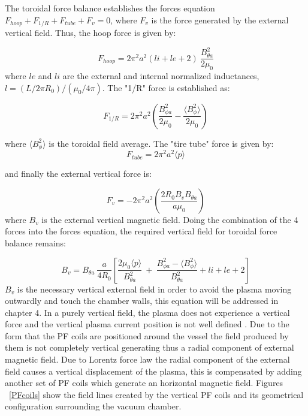 The toroidal force balance establishes the forces equation $F_{hoop}+ F_{1/R} + F_{tube}+ F_{v} =0$, where $F_v$ is the force generated by the external vertical field. Thus, the hoop force is given by:

\begin{equation}
F_{hoop}=2\pi^2a^2(li+le+2)~\frac{B_{\theta a}^2}{2\mu_0}
\end{equation}
 where $le$ and $li$ are the external and internal normalized inductances, $l= (L/2\pi R_0)/(\mu_0/4\pi)$. The "1/R" force is established as:
 
 \begin{equation}
 F_{1/R}=2\pi^2a^2 \left(\frac{ B_{\phi a}^2}{2\mu_0 }-\frac{\langle B_{\phi}^2 \rangle}{ 2\mu_0}\right)
 \end{equation}

where $\langle B_{\phi}^2 \rangle$ is the toroidal field average. The "tire tube" force is given by:
\begin{equation}
F_{tube}=2\pi^2a^2\langle p \rangle
\end{equation}

and finally the external vertical force is:

\begin{equation}
F_v=-2\pi^2a^2\left(\frac{2R_0 B_v B_{\theta a}}{a\mu_0}\right)
\end{equation}
 where $B_v$ is the external vertical magnetic field. Doing the combination of the 4 forces into the forces equation, the required vertical field for toroidal force balance remains:
 
 \begin{equation}
 B_v=B_{\theta a} ~\frac{a}{4R_0}\left[ \frac{2\mu_0 \langle p \rangle }{ B_{\theta a}^2} ~+~\frac{ B_{\phi a}^2 - \langle B_{\phi}^2 \rangle }{B_{\theta a}^2 } +li+le+2 \right]
 \label{force_balance}
 \end{equation}
  $B_v$ is the necessary vertical external field in order to avoid the plasma moving outwardly and touch the chamber walls, this equation will be addressed in chapter 4. In a purely vertical field, the plasma does not experience a vertical force and the vertical plasma current position is not well defined \cite[Chapter~4]{Zohm2015}. Due to the form  that the PF coils are positioned around the vessel the field produced by them is not completely vertical generating thus a radial component of  external magnetic field.  Due to Lorentz force law  the radial component of the external field  causes a vertical displacement of the plasma, this is compensated by adding another set of PF coils which generate an horizontal magnetic field. Figures ~\ref{PFcoils} show the field lines created by the vertical PF coils and its geometrical configuration surrounding the vacuum chamber. \smallskip
  

